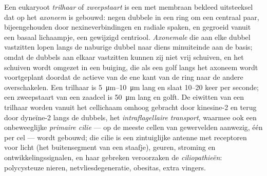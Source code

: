 \begin{definition}\label{def:b3:cytoskeleton-motility:cilia}
Een eukaryoot \emph{trilhaar} of \emph{zweepstaart} is een met membraan
bekleed uitsteeksel dat op het \emph{axoneem} is gebouwd: negen
dubbele  in een ring om een centraal paar, bijeengehouden
door nexineverbindingen en radiale spaken, en gegroeid vanuit een
basaal lichaampje, een gewijzigd centriool. \emph{Axonemale }
die aan elke dubbel vastzitten lopen langs de naburige dubbel naar
diens minuiteinde aan de basis; omdat de dubbels aan elkaar vastzitten
kunnen zij niet vrij schuiven, en het schuiven wordt omgezet in een
buiging, die als een golf langs het axoneem wordt voortgeplant doordat
de actieve  van de ene kant van de ring naar de andere
overschakelen. Een trilhaar is \qtyrange{5}{10}{\micro m} lang en slaat
\numrange{10}{20} keer per seconde; een zweepstaart van een zaadcel is
\qty{50}{\micro m} lang en golft. De eiwitten van een trilhaar worden
vanuit het cellichaam omhoog gebracht door kinesine-2 en terug door
dyneïne-2 langs de dubbels, het \emph{intraflagellaire transport},
waarmee ook een onbeweeglijke \emph{primaire cilie} --- op de meeste
cellen van gewervelden aanwezig, één per cel --- wordt gebouwd; die
cilie is een zintuiglijke antenne met receptoren voor licht (het
buitensegment van een staafje), geuren, stroming en
ontwikkelingssignalen, en haar gebreken veroorzaken de
\emph{ciliopathieën}: polycysteuze nieren, netvliesdegeneratie,
obesitas, extra vingers.
\end{definition}

